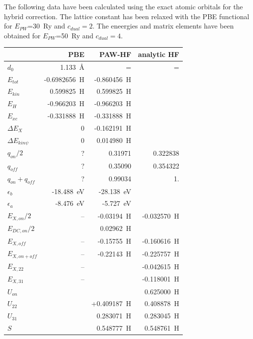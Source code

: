 \documentclass[11pt,a4paper]{report}
\begin{document}
The following data have been calculated using the exact atomic
orbitals for the hybrid correction. The lattice constant has been
relaxed with the PBE functional for $E_{PW}$=30~Ry and
$c_{dual}=2$. The eneergies and matrix elements have been obtained for
$E_{PW}$=50~Ry and $c_{dual}=4$.
\begin{center}
\begin{tabular}{|l|r|r|r|}
\hline
         & PBE  &PAW-HF  &analytic HF  \\
\hline
$d_0$    & 1.133~\AA & =  & =\\
$E_{tot}$ &  -0.6982656~H & -0.860456~H & \\
$E_{kin}$ &   0.599825~H &  0.599825~H & \\
$E_{H}$   &  -0.966203~H & -0.966203~H & \\
$E_{xc}$  &  -0.331888~H & -0.331888~H & \\
$\Delta E_{X}$ & 0        & -0.162191~H &\\
$\Delta E_{kin\psi}$ & 0   &  0.014980~H & \\
$q_{on}/2$          &  ?   & 0.31971 & 0.322838 \\
$q_{off}$           &  ?   & 0.35090 & 0.354322 \\
$q_{on}+q_{off}$     &  ?   & 0.99034 & 1.  \\
$\epsilon_b$ & -18.488~eV & -28.138~eV & \\
$\epsilon_a$ & -8.476~eV  & -5.727~eV &  \\
\hline
$E_{X,on}/2$   & -- &  -0.03194~H & -0.032570~H\\
$E_{DC,on}/2$  &    &   0.02962~H & \\
$E_{X,off} $   & -- &  -0.15755~H & -0.160616~H\\
$E_{X,on+off} $ & -- &  -0.22143~H & -0.225757~H\\
$E_{X,22} $    & -- &               & -0.042615~H\\
$E_{X,31} $    & -- &               & -0.118001~H\\
$U_{on}$       &    &              & 0.625000~H\\ 
$U_{22}$       &    &  +0.409187~H & 0.408878~H\\ 
$U_{31}$       &    &   0.283071~H & 0.283045~H\\ 
$S$           &    &   0.548777~H  & 0.548761~H\\
\hline
\end{tabular}
\end{center}
\end{document}
